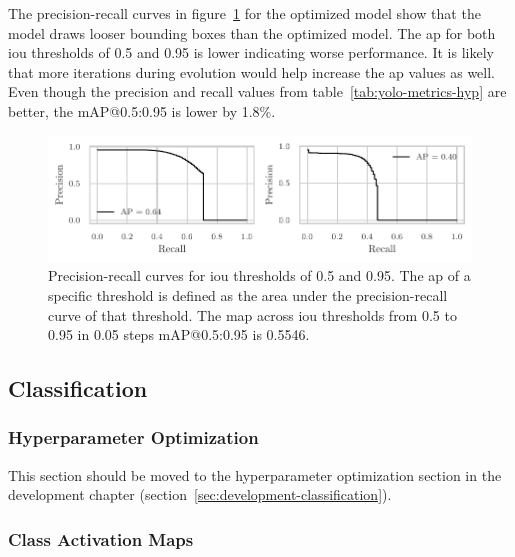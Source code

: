 \documentclass[draft,final]{vutinfth} %
\begin{document}
The precision-recall curves in figure~\ref{fig:yolo-ap-hyp} for the
optimized model show that the model draws looser bounding boxes than
the optimized model. The \gls{ap} for both \gls{iou} thresholds of 0.5
and 0.95 is lower indicating worse performance. It is likely that more
iterations during evolution would help increase the \gls{ap} values as
well. Even though the precision and recall values from
table~\ref{tab:yolo-metrics-hyp} are better, the \textsf{mAP}@0.5:0.95
is lower by 1.8\%.

\begin{figure}
  \centering
  \includegraphics{graphics/APpt5-pt95-final.pdf}
  \caption[Hyper-parameter optimized object detection AP@0.5 and
  AP@0.95.]{Precision-recall curves for \gls{iou} thresholds of 0.5
    and 0.95. The \gls{ap} of a specific threshold is defined as the
    area under the precision-recall curve of that threshold. The
    \gls{map} across \gls{iou} thresholds from 0.5 to 0.95 in 0.05
    steps \textsf{mAP}@0.5:0.95 is 0.5546.}
  \label{fig:yolo-ap-hyp}
\end{figure}

\subsection{Classification}
\label{ssec:classifier-eval}


\subsubsection{Hyperparameter Optimization}
\label{sssec:classifier-hyp-opt}

This section should be moved to the hyperparameter optimization
section in the development chapter
(section~\ref{sec:development-classification}).



\subsubsection{Class Activation Maps}
\label{sssec:classifier-cam}
\end{document}

